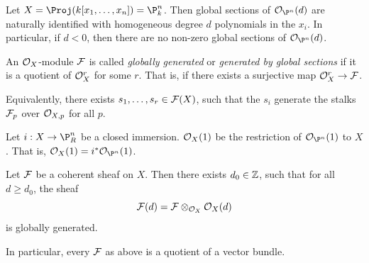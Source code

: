 \documentclass{article}
\begin{document}
Let \(X = \Proj(k[x_1, \dots, x_n]) = \P^n_k\). Then global sections of \(\mcO_{\P^n}(d)\) are naturally identified with homogeneous degree \(d\) polynomials in the \(x_i\). In particular, if \(d < 0\), then there are no non-zero global sections of \(\mcO_{\P^n}(d)\).

\begin{definition}
    An \(\mathcal{O}_X\)-module \(\mathcal{F}\) is called \emph{globally generated} or \emph{generated by global sections} if it is a quotient of \(\mathcal{O}_X^r\) for some \(r\). That is, if there exists a surjective map \(\mathcal{O}_X^r \to \mathcal{F}\).

    Equivalently, there exists \(s_1, \dots, s_r \in \mathcal{F}(X)\), such that the \(s_i\) generate the stalks \(\mathcal{F}_p\) over \(\mathcal{O}_{X, p}\) for all \(p\).
\end{definition}

Let \(i : X \to \P^n_R\) be a closed immersion. \(\mathcal{O}_X(1)\) be the restriction of \(\mcO_{\P^n}(1)\) to \(X\). That is, \(\mcO_X(1) = i^*\mcO_{\P^n}(1)\).

\begin{theorem}
    [Serre]
    Let \(\mathcal{F}\) be a coherent sheaf on \(X\). Then there exists \(d_0 \in \mathbb{Z}\), such that for all \(d \ge d_0\), the sheaf
    \[\mathcal{F}(d) = \mathcal{F} \otimes_{\mathcal{O}_X} \mathcal{O}_X(d)\]
    is globally generated.
\end{theorem}

In particular, every \(\mathcal{F}\) as above is a quotient of a vector bundle.
\end{document}
